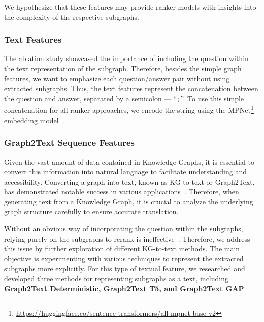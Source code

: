 \noindent We hypothesize that these features may provide ranker models with insights into the complexity of the respective subgraphs.


\subsubsection{Text Features} \label{sec:methods_kg_path_fusion:text_features} The ablation study showcased the importance of including the question within the text representation of the subgraph. Therefore, besides the simple graph features, we want to emphasize each question/answer pair without using extracted subgraphs. Thus, the text features represent the concatenation between the question and answer, separated by a semicolon --- ``\texttt{;}''. To use this simple concatenation for all ranker approaches, we encode the string using the MPNet\footnote{\url{https://huggingface.co/sentence-transformers/all-mpnet-base-v2}} embedding model~\cite{DBLP:conf/nips/Song0QLL20}.


\subsubsection{Graph2Text Sequence Features} \label{sec:methods_kg_path_fusion:g2t_seq} 
Given the vast amount of data contained in Knowledge Graphs, it is essential to convert this information into natural language to facilitate understanding and accessibility. Converting a graph into text, known as KG-to-text or Graph2Text, has demonstrated notable success in various applications~\cite{DBLP:journals/corr/abs-2309-11206}. Therefore, when generating text from a Knowledge Graph, it is crucial to analyze the underlying graph structure carefully to ensure accurate translation.

Without an obvious way of incorporating the question within the subgraphs, relying purely on the subgraphs to rerank is ineffective~\cite{DBLP:conf/paclic/SalnikovLRNBMP23-originalpaper}. Therefore, we address this issue by further exploration of different KG-to-text methods. The main objective is experimenting with various techniques to represent the extracted subgraphs more explicitly. For this type of textual feature, we researched and developed three methods for representing subgraphs as a text, including \textbf{Graph2Text Deterministic,  Graph2Text T5, and  Graph2Text GAP}.

